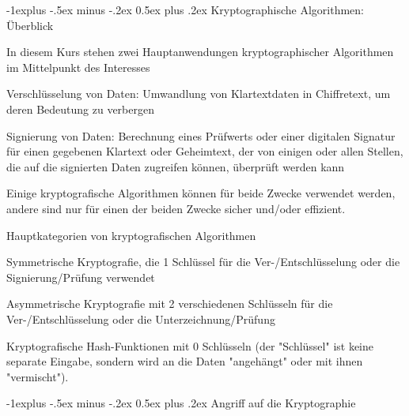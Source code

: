 \documentclass[a4paper]{article}
\makeatletter
\renewcommand{\subsection}{\@startsection{subsection}{2}{0mm}%
 {-1explus -.5ex minus -.2ex}%
 {0.5ex plus .2ex}%
 {\normalfont\normalsize\bfseries}}
\makeatother
\begin{document}
\begin{multicols}{3}
      \subsection{Kryptographische Algorithmen:
            Überblick}

      \begin{itemize*}
            \item
            In diesem Kurs stehen zwei Hauptanwendungen kryptographischer
            Algorithmen im Mittelpunkt des Interesses

            \begin{itemize*}
                  \item Verschlüsselung von Daten: Umwandlung von Klartextdaten in Chiffretext, um deren Bedeutung zu verbergen
                  \item Signierung von Daten: Berechnung eines Prüfwerts oder einer digitalen Signatur für einen gegebenen Klartext oder Geheimtext, der von einigen oder allen Stellen, die auf die signierten Daten zugreifen können, überprüft werden kann
            \end{itemize*}
            \item
            Einige kryptografische Algorithmen können für beide Zwecke verwendet
            werden, andere sind nur für einen der beiden Zwecke sicher und/oder
            effizient.
            \item
            Hauptkategorien von kryptografischen Algorithmen

            \begin{itemize*}
                  \item Symmetrische Kryptografie, die 1 Schlüssel für die Ver-/Entschlüsselung oder die Signierung/Prüfung verwendet
                  \item Asymmetrische Kryptografie mit 2 verschiedenen Schlüsseln für die Ver-/Entschlüsselung oder die Unterzeichnung/Prüfung
                  \item Kryptografische Hash-Funktionen mit 0 Schlüsseln (der "Schlüssel" ist keine separate Eingabe, sondern wird an die Daten "angehängt" oder mit ihnen "vermischt").
            \end{itemize*}
      \end{itemize*}


      \subsection{Angriff auf die
            Kryptographie}



\end{multicols}
\end{document}
